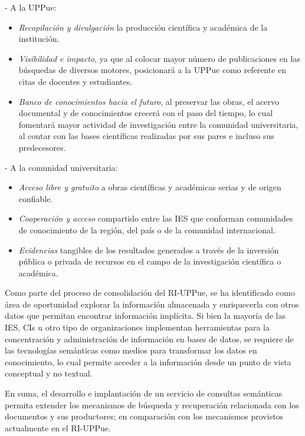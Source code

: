 - A la UPPue:
	\begin{itemize}
	\item \textit{Recopilaci\'on y divulgaci\'on} la producci\'on cient\'ifica y acad\'emica de la instituci\'on.
    \item \textit{Visibilidad e impacto}, ya que al colocar mayor n\'umero de publicaciones en las b\'usquedas de diversos motores, posicionar\'a a la UPPue como referente en citas de docentes y estudiantes.
    \item \textit{Banco de conocimientos hacia el futuro}, al preservar las obras, el acervo do\-cu\-mental y de conocimientos crecer\'a con el paso del tiempo, lo cual fomentar\'a mayor actividad de investigaci\'on entre la comunidad universitaria, al contar con las bases cient\'ificas realizadas por sus pares e incluso sus predecesores.
	\end{itemize}
	
- A la comunidad universitaria:
  \begin{itemize}
  \item \textit{Acceso libre y gratuito} a obras cient\'ificas y acad\'emicas serias y de origen confiable.
  \item \textit{Cooperaci\'on y acceso} compartido entre las IES que conforman comunidades de conocimiento de la regi\'on, del pa\'is o de la comunidad internacional.
  \item \textit{Evidencias} tangibles de los resultados generados a trav\'es de la inversi\'on p\'ublica o privada de recursos en el campo de la investigaci\'on cient\'ifica o acad\'emica.
  \end{itemize}

Como parte del proceso de consolidaci\'on del RI-UPPue, se ha identificado como \'area de oportunidad explorar la informaci\'on almacenada y enriquecerla con otros datos que permitan encontrar informaci\'on impl\'icita. Si bien la mayor\'ia de las IES, CIs u otro tipo de organizaciones implementan herra\-mi\-en\-tas para la concentraci\'on y administraci\'on de informaci\'on en bases de datos, se requiere de las tecnolog\'ias sem\'anticas como medios para transformar los datos en conocimiento, lo cual permite acceder a la informaci\'on desde un punto de vista conceptual y no textual.\newline

En suma, el desarrollo e implantaci\'on de un servicio de consultas sem\'anticas permita extender los mecanismos de b\'usqueda y recuperaci\'on relacionada con los documentos y sus productores; en comparaci\'on con los mecanismos provistos actualmente en el RI-UPPue.


